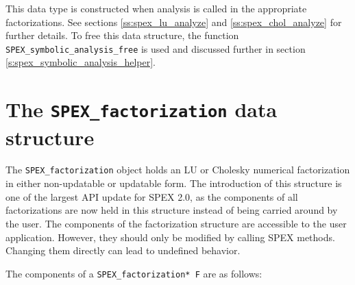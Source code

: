 \documentclass[12pt]{report}
\theoremstyle{definition}
\begin{document}
This data type is constructed when analysis is called in the appropriate factorizations. See sections \ref{ss:spex_lu_analyze} and \ref{ss:spex_chol_analyze} for further details. To free this data structure, the function \verb|SPEX_symbolic_analysis_free| is used and discussed further in section \ref{s:spex_symbolic_analysis_helper}.

\section{The \texttt{SPEX\_factorization} data structure}

The \verb|SPEX_factorization| object holds an LU or Cholesky numerical factorization in either non-updatable or updatable form. The introduction of this structure is one of the largest API update for SPEX 2.0, as the components of all factorizations are now held in this structure instead of being carried around by the user. The components of the factorization structure are accessible to the user application. However, they should only be modified by calling SPEX methods.  Changing them directly can lead to undefined behavior.

The components of a \verb|SPEX_factorization* F| are as follows:
\end{document}
